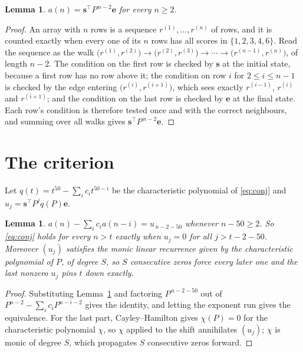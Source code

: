 \documentclass[11pt,a4paper]{article}
\theoremstyle{plain}
\newtheorem{lemma}[theorem]{Lemma}
\theoremstyle{definition}
\begin{document}
\begin{lemma}\label{lem:walk}
$a(n)=\mathbf{s}^{\!\top}P^{\,n-2}\mathbf{e}$ for every $n\ge2$.
\end{lemma}

\begin{proof}
An array with $n$ rows is a sequence $r^{(1)},\dots,r^{(n)}$ of rows, and it is counted
exactly when every one of its $n$ rows has all scores in $\{1,2,3,4,6\}$. Read the sequence as the
walk $\bigl(r^{(1)},r^{(2)}\bigr)\to\bigl(r^{(2)},r^{(3)}\bigr)\to\cdots\to
\bigl(r^{(n-1)},r^{(n)}\bigr)$, of length $n-2$. The condition on the first row is
checked by $\mathbf{s}$ at the initial state, because a first row has no row above it; the
condition on row $i$ for $2\le i\le n-1$ is checked by the edge entering
$\bigl(r^{(i)},r^{(i+1)}\bigr)$, which sees exactly $r^{(i-1)}$, $r^{(i)}$ and
$r^{(i+1)}$; and the condition on the last row is checked by $\mathbf{e}$ at the final
state. Each row's condition is therefore tested once and with the correct neighbours, and
summing over all walks gives $\mathbf{s}^{\!\top}P^{\,n-2}\mathbf{e}$.
\end{proof}

\section{The criterion}

Let $q(t)=t^{50}-\sum_i c_i t^{50-i}$ be the characteristic polynomial of
\eqref{eq:conj} and $u_j=\mathbf{s}^{\!\top}P^{j}q(P)\mathbf{e}$.

\begin{lemma}\label{lem:crit}
$a(n)-\sum_i c_i a(n-i)=u_{\,n-2-50}$ whenever $n-50\ge2$. So \eqref{eq:conj}
holds for every $n>t$ exactly when $u_j=0$ for all $j>t-2-50$. Moreover $(u_j)$
satisfies the monic linear recurrence given by the characteristic polynomial of $P$, of
degree $S$, so $S$ consecutive zeros force every later one and the last nonzero $u_j$ pins
$t$ down exactly.
\end{lemma}

\begin{proof}
Substituting Lemma~\ref{lem:walk} and factoring $P^{\,n-2-50}$ out of
$P^{n-2}-\sum_i c_i P^{n-i-2}$ gives the identity, and letting the exponent run gives the
equivalence. For the last part, Cayley--Hamilton gives $\chi(P)=0$ for the characteristic
polynomial $\chi$, so $\chi$ applied to the shift annihilates $(u_j)$; $\chi$ is monic of
degree $S$, which propagates $S$ consecutive zeros forward.
\end{proof}
\end{document}
